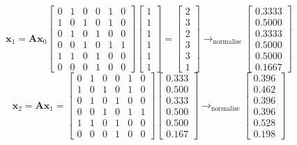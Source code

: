 \[ \textbf{x}_1 = \textbf{Ax}_0 \begin{bmatrix}
0 & 1 & 0 & 0 & 1 & 0 \\
1 & 0 & 1 & 0 & 1 & 0 \\
0 & 1 & 0 & 1 & 0 & 0 \\
0 & 0 & 1 & 0 & 1 & 1 \\
1 & 1 & 0 & 1 & 0 & 0 \\
0 & 0 & 0 & 1 & 0 & 0
\end{bmatrix}\begin{bmatrix}
    1\\1\\1\\1\\1\\1
\end{bmatrix} = 
\begin{bmatrix}
    2\\3\\2\\3\\3\\1
\end{bmatrix} \rightarrow_{\text{normalise}} 
\begin{bmatrix}
0.3333 \\ 0.5000 \\ 0.3333 \\ 0.5000 \\ 0.5000 \\ 0.1667
\end{bmatrix}
\]
\[
\textbf{x}_2 = \textbf{Ax}_1 = \begin{bmatrix}
0 & 1 & 0 & 0 & 1 & 0 \\
1 & 0 & 1 & 0 & 1 & 0 \\
0 & 1 & 0 & 1 & 0 & 0 \\
0 & 0 & 1 & 0 & 1 & 1 \\
1 & 1 & 0 & 1 & 0 & 0 \\
0 & 0 & 0 & 1 & 0 & 0
\end{bmatrix}\begin{bmatrix}
0.333 \\ 0.500 \\ 0.333 \\ 0.500 \\ 0.500 \\ 0.167
\end{bmatrix} \rightarrow_{\text{normalise}}
\begin{bmatrix}
0.396 \\ 0.462 \\ 0.396 \\ 0.396 \\ 0.528 \\ 0.198
\end{bmatrix}
\]

